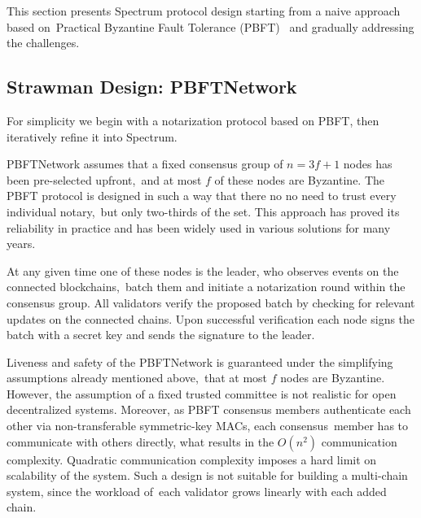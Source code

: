 This section presents Spectrum protocol design starting from a naive approach based on\
Practical Byzantine Fault Tolerance (PBFT)~\cite{Castro2001} and gradually addressing the challenges.

\subsection{Strawman Design: PBFTNetwork}\label{subsec:strawman-design}

For simplicity we begin with a notarization protocol based on PBFT, then iteratively refine it into Spectrum.

PBFTNetwork assumes that a fixed consensus group of ${n = 3f + 1}$ nodes has been pre-selected upfront,\
and at most $f$ of these nodes are Byzantine.
The PBFT protocol is designed in such a way that there no no need to trust every individual notary,\
but only two-thirds of the set.
This approach has proved its reliability in practice and has been widely used in various solutions for many years.

At any given time one of these nodes is the leader, who observes events on the connected blockchains,\
batch them and initiate a notarization round within the consensus group.
All validators verify the proposed batch by checking for relevant updates on the connected chains.
Upon successful verification each node signs the batch with a secret key and sends the signature to the leader.

Liveness and safety of the PBFTNetwork is guaranteed under the simplifying assumptions already mentioned above,\
that at most $f$ nodes are Byzantine.
However, the assumption of a fixed trusted committee is not realistic for open decentralized systems.
Moreover, as PBFT consensus members authenticate each other via non-transferable symmetric-key MACs, each consensus\
member has to communicate with others directly, what results in the $O(n^2)$ communication complexity.
Quadratic communication complexity imposes a hard limit on scalability of the system.
Such a design is not suitable for building a multi-chain system, since the workload of\
each validator grows linearly with each added chain.

